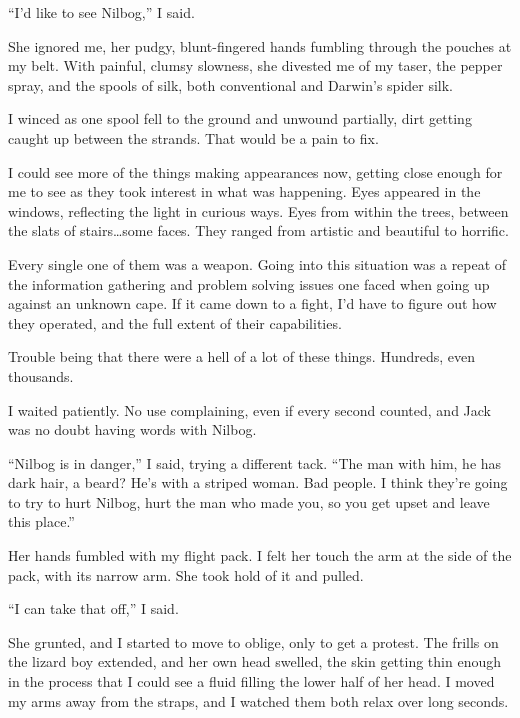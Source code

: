 ``I'd like to see Nilbog,'' I said.



She ignored me, her pudgy, blunt-fingered hands fumbling through the pouches at my belt.  With painful, clumsy slowness, she divested me of my taser, the pepper spray, and the spools of silk, both conventional and Darwin's spider silk.



I winced as one spool fell to the ground and unwound partially, dirt getting caught up between the strands.  That would be a pain to fix.



I could see more of the things making appearances now, getting close enough for me to see as they took interest in what was happening.  Eyes appeared in the windows, reflecting the light in curious ways.  Eyes from within the trees, between the slats of stairs\ldots some faces.  They ranged from artistic and beautiful to horrific.



Every single one of them was a weapon.  Going into this situation was a repeat of the information gathering and problem solving issues one faced when going up against an unknown cape.  If it came down to a fight, I'd have to figure out how they operated, and the full extent of their capabilities.



Trouble being that there were a hell of a lot of these things.  Hundreds, even thousands.



I waited patiently.  No use complaining, even if every second counted, and Jack was no doubt having words with Nilbog.



``Nilbog is in danger,'' I said, trying a different tack. ``The man with him, he has dark hair, a beard?  He's with a striped woman.  Bad people.  I think they're going to try to hurt Nilbog, hurt the man who made you, so you get upset and leave this place.''



Her hands fumbled with my flight pack.  I felt her touch the arm at the side of the pack, with its narrow arm.  She took hold of it and pulled.



``I can take that off,'' I said.



She grunted, and I started to move to oblige, only to get a protest.  The frills on the lizard boy extended, and her own head swelled, the skin getting thin enough in the process that I could see a fluid filling the lower half of her head.  I moved my arms away from the straps, and I watched them both relax over long seconds.



